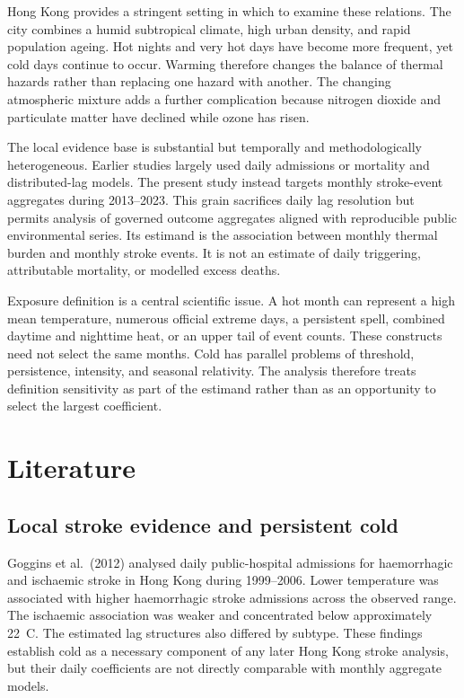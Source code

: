 \documentclass[11pt,a4paper]{article}
\begin{document}
Hong Kong provides a stringent setting in which to examine these relations. The city combines a humid subtropical climate, high urban density, and rapid population ageing. Hot nights and very hot days have become more frequent, yet cold days continue to occur. Warming therefore changes the balance of thermal hazards rather than replacing one hazard with another. The changing atmospheric mixture adds a further complication because nitrogen dioxide and particulate matter have declined while ozone has risen.

The local evidence base is substantial but temporally and methodologically heterogeneous. Earlier studies largely used daily admissions or mortality and distributed-lag models. The present study instead targets monthly stroke-event aggregates during 2013--2023. This grain sacrifices daily lag resolution but permits analysis of governed outcome aggregates aligned with reproducible public environmental series. Its estimand is the association between monthly thermal burden and monthly stroke events. It is not an estimate of daily triggering, attributable mortality, or modelled excess deaths.

Exposure definition is a central scientific issue. A hot month can represent a high mean temperature, numerous official extreme days, a persistent spell, combined daytime and nighttime heat, or an upper tail of event counts. These constructs need not select the same months. Cold has parallel problems of threshold, persistence, intensity, and seasonal relativity. The analysis therefore treats definition sensitivity as part of the estimand rather than as an opportunity to select the largest coefficient.

\section{Literature}

\subsection{Local stroke evidence and persistent cold}

Goggins et al.\ (2012) analysed daily public-hospital admissions for haemorrhagic and ischaemic stroke in Hong Kong during 1999--2006. Lower temperature was associated with higher haemorrhagic stroke admissions across the observed range. The ischaemic association was weaker and concentrated below approximately 22~\textdegree C. The estimated lag structures also differed by subtype. These findings establish cold as a necessary component of any later Hong Kong stroke analysis, but their daily coefficients are not directly comparable with monthly aggregate models.
\end{document}
